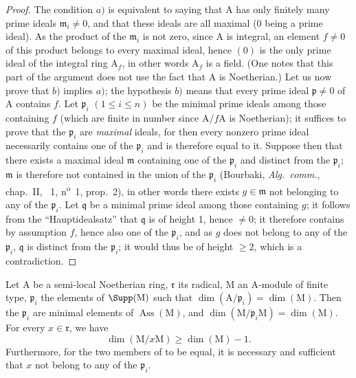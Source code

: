 \begin{proof}
The condition $a)$ is equivalent to saying that $\mathrm{A}$ has only finitely many prime ideals $\mathfrak{m}_i\neq 0$, and that these ideals are all maximal (0 being a prime ideal).
As the product of the $\mathfrak{m}_i$ is not zero, since $\mathrm{A}$ is integral, an element $f\neq 0$ of this product belongs to every maximal ideal, hence $(0)$ is the only prime ideal of the integral ring $\mathrm{A}_f$, in other words $\mathrm{A}_f$ is a field.
(One notes that this part of the argument does not use the fact that $\mathrm{A}$ is Noetherian.)
Let us now prove that $b)$ implies $a)$; the hypothesis $b)$ means that every prime ideal $\mathfrak{p}\neq 0$ of $\mathrm{A}$ contains $f$.
Let $\mathfrak{p}_i$ $(1\leq i\leq n)$ be the minimal prime ideals among those containing $f$ (which are finite in number since $\mathrm{A}/f\mathrm{A}$ is Noetherian); it suffices to prove that the $\mathfrak{p}_i$ are \emph{maximal} ideals, for then every nonzero prime ideal necessarily contains one of the $\mathfrak{p}_i$ and is therefore equal to it.
Suppose then that there exists a maximal ideal $\mathfrak{m}$ containing one of the $\mathfrak{p}_i$ and distinct from the $\mathfrak{p}_i$; $\mathfrak{m}$ is therefore not contained in the union of the $\mathfrak{p}_i$ (Bourbaki, \emph{Alg.~comm.}, chap.~II, \textsection~1, n\textsuperscript{o}~1, prop.~2), in other words there exists $g\in\mathfrak{m}$ not belonging to any of the $\mathfrak{p}_i$.
Let $\mathfrak{q}$ be a minimal prime ideal among those containing $g$; it follows from the ``Hauptidealsatz''  that $\mathfrak{q}$ is of height 1, hence $\neq 0$; it therefore contains by assumption $f$, hence also one of the $\mathfrak{p}_i$, and as $g$ does not belong to any of the $\mathfrak{p}_i$, $\mathfrak{q}$ is distinct from the $\mathfrak{p}_i$; it would thus be of height $\geq 2$, which is a contradiction.
\end{proof}

\begin{proposition}[16.3.4]
\label{0.16.3.4}
Let $\mathrm{A}$ be a semi-local Noetherian ring, $\mathfrak{r}$ its radical, $\mathrm{M}$ an $\mathrm{A}$-module of finite type, $\mathfrak{p}_i$ the elements of $\Supp(\mathrm{M})$ such that $\dim(\mathrm{A}/\mathfrak{p}_i)=\dim(\mathrm{M})$.
Then the $\mathfrak{p}_i$ are minimal elements of $\operatorname{Ass}(\mathrm{M})$, and $\dim(\mathrm{M}/\mathfrak{p}_i\mathrm{M})=\dim(\mathrm{M})$.
For every $x\in\mathfrak{r}$, we have
\begin{equation}
\label{0.16.3.4.1}
\tag{16.3.4.1}
  \dim(\mathrm{M}/x\mathrm{M})\geq\dim(\mathrm{M})-1.
\end{equation}
Furthermore, for the two members of  to be equal, it is necessary and sufficient that $x$ not belong to any of the $\mathfrak{p}_i$.
\end{proposition}

